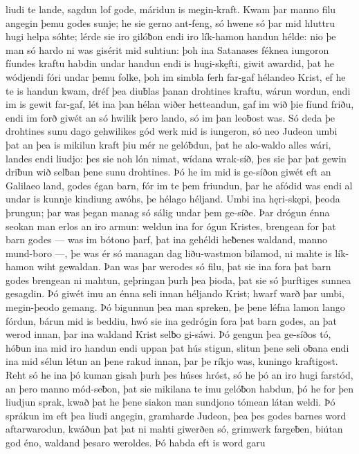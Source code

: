 liudi te lande, \hld\ sagdun lof gode,
máridun is megin-kraft. \hld\ Kwam þar manno filu
angegin þemu godes sunje; \hld\ he sie gerno ant-feng,
só hwene só þar mid hluttru hugi \hld\ helpa sóhte;
lérde sie iro gilóƀon \hld\ endi iro lík-hamon
handun hélde: \hld\ nio þe man só hardo ni was
gisérit mid suhtiun: \hld\ þoh ina Satanases
féknea iungoron \hld\ fíundes kraftu
habdin undar handun \hld\ endi is hugi-skęfti,
giwit awardid, þ\hld\ at he wódjendi
fóri undar þemu folke, \hld\ þoh im simbla ferh far-gaf
hélandeo Krist, ef he te is handun kwam,
dréf þea diuƀlas þanan drohtines kraftu,
wárun wordun, endi im is gewit far-gaf,
lét ina þan hélan wiðer hetteandun,
gaf im wið þie fíund friðu, endi im forð giwét
an só hwilik þero lando, só im þan leoƀost was.
Só deda þe drohtines sunu dago gehwilikes
gód werk mid is iungeron, só neo Judeon umbi þat
an þea is mikilun kraft þiu mér ne gelóƀdun,
þat he alo-waldo alles wári,
landes endi liudjo: þes sie noh lón nimat,
wídana wrak-síð, þes sie þar þat gewin driƀun
wið selƀan þene sunu drohtines. Þó he im mid is ge-síðon giwét
eft an Galilaeo land, godes égan barn,
fór im te þem friundun, þar he afódid was
endi al undar is kunnje kindiung awóhs,
þe hélago héljand. Umbi ina hęri-skępi,
þeoda þrungun; þar was þegan manag
só sálig undar þem ge-síðe. Þar drógun énna seokan man
erlos an iro armun: weldun ina for ógun Kristes,
brengean for þat barn godes — was im bótono þarf,
þat ina gehéldi heƀenes waldand,
manno mund-boro —, þe was ér só managan dag
liðu-wastmon bilamod, ni mahte is lík-hamon
wiht gewaldan. Þan was þar werodes só filu,
þat sie ina fora þat barn godes brengean ni mahtun,
geþringan þurh þea þioda, þat sie só þurftiges
sunnea gesagdin. Þó giwét imu an énna seli innan
héljando Krist; hwarf warð þar umbi,
megin-þeodo gemang. Þó bigunnun þea man spreken,
þe þene léfna lamon lango fórdun,
bárun mid is beddiu, hwó sie ina gedrógin fora þat barn godes,
an þat werod innan, þar ina waldand Krist
selƀo gi-sáwi. Þó gengun þea ge-síðos tó,
hóƀun ina mid iro handun endi uppan þat hús stigun,
slitun þene seli oƀana endi ina mid sélun létun
an þene rakud innan, þar þe ríkjo was,
kuningo kraftigost. Reht só he ina þó kuman gisah
þurh þes húses hróst, só he þó an iro hugi farstód,
an þero manno mód-seƀon, þat sie mikilana te imu
gelóƀon habdun, þó he for þen liudjun sprak,
kwað þat he þene siakon man sundjono tómean
látan weldi. Þó sprákun im eft þea liudi angegin,
gramharde Judeon, þea þes godes barnes
word aftarwarodun, kwáðun þat þat ni mahti giwerðen só,
grimwerk fargeƀen, biútan god éno,
waldand þesaro weroldes. Þó habda eft is word garu

